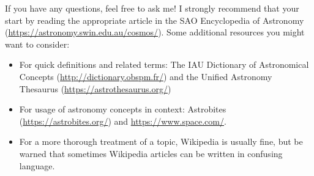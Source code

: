 \documentclass[11pt]{article}
\begin{document}
\medskip \noindent
If you have any questions, feel free to ask me! I strongly recommend that your start by reading the appropriate article in the SAO Encyclopedia of Astronomy (\url{https://astronomy.swin.edu.au/cosmos/}). Some additional resources you might want to consider:
\begin{itemize}
    \item For quick definitions and related terms: The IAU Dictionary of Astronomical Concepts (\url{http://dictionary.obspm.fr/}) and the Unified Astronomy Thesaurus (\url{https://astrothesaurus.org/})   
    
    \item For usage of astronomy concepts in context: Astrobites (\url{https://astrobites.org/}) and \url{https://www.space.com/}.
    
    \item For a more thorough treatment of a topic, Wikipedia is usually fine, but be warned that sometimes Wikipedia articles can be written in confusing language.
\end{itemize}

\end{document}
